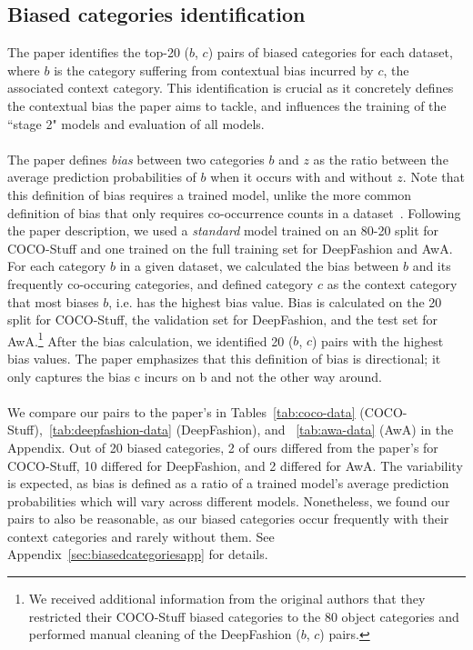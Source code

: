 \subsection{Biased categories identification} \label{sec:biasedcategories}

The paper identifies the top-20 ($b$, $c$) pairs of biased categories for each dataset, where $b$ is the category suffering from contextual bias incurred by $c$, the associated context category. This identification is crucial as it concretely defines the contextual bias the paper aims to tackle, and influences the training of the ``stage 2" models and evaluation of all models.\\
\\
The paper defines \emph{bias} between two categories $b$ and $z$ as the ratio between the average prediction probabilities of $b$ when it occurs with and without $z$. Note that this definition of bias requires a trained model, unlike the more common definition of bias that only requires co-occurrence counts in a dataset~\cite{zhao_MALS_EMNLP2017}. Following the paper description, we used a \emph{standard} model trained on an 80-20 split for COCO-Stuff and one trained on the full training set for DeepFashion and AwA. For each category $b$ in a given dataset, we calculated the bias between $b$ and its frequently co-occuring categories, and defined category $c$ as the context category that most biases $b$, i.e. has the highest bias value. Bias is calculated on the 20 split for COCO-Stuff, the validation set for DeepFashion, and the test set for AwA.\footnote{We received additional information from the original authors that they restricted their COCO-Stuff biased categories to the 80 object categories and performed manual cleaning of the DeepFashion ($b$, $c$) pairs.} After the bias calculation, we identified 20 ($b$, $c$) pairs with the highest bias values. The paper emphasizes that this definition of bias is directional; it only captures the bias c incurs on b and not the other way around. \\
\\
We compare our pairs to the paper's in Tables~\ref{tab:coco-data} (COCO-Stuff),~\ref{tab:deepfashion-data} (DeepFashion), and ~\ref{tab:awa-data} (AwA) in the Appendix. Out of 20 biased categories, 2 of ours differed from the paper's for COCO-Stuff, 10 differed for DeepFashion, and 2 differed for AwA. The variability is expected, as bias is defined as a ratio of a trained model's average prediction probabilities which will vary across different models. Nonetheless, we found our pairs to also be reasonable, as our biased categories occur frequently with their context categories and rarely without them. See Appendix~\ref{sec:biasedcategoriesapp} for details. 

